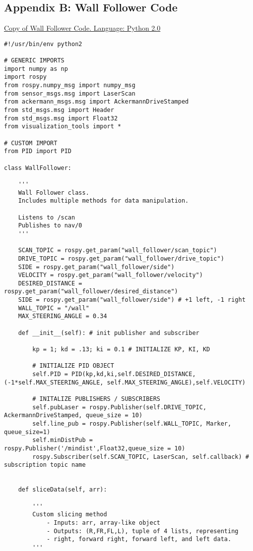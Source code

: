 \documentclass{article}
\begin{document}
\subsection{Appendix B: Wall Follower Code}
\underline{Copy of Wall Follower Code. Language: Python 2.0}

{\footnotesize
\begin{verbatim}
#!/usr/bin/env python2

# GENERIC IMPORTS
import numpy as np
import rospy
from rospy.numpy_msg import numpy_msg
from sensor_msgs.msg import LaserScan
from ackermann_msgs.msg import AckermannDriveStamped
from std_msgs.msg import Header
from std_msgs.msg import Float32
from visualization_tools import *

# CUSTOM IMPORT
from PID import PID

class WallFollower:

    '''
    Wall Follower class. 
    Includes multiple methods for data manipulation. 

    Listens to /scan
    Publishes to nav/0 
    '''

    SCAN_TOPIC = rospy.get_param("wall_follower/scan_topic")
    DRIVE_TOPIC = rospy.get_param("wall_follower/drive_topic")
    SIDE = rospy.get_param("wall_follower/side")
    VELOCITY = rospy.get_param("wall_follower/velocity")
    DESIRED_DISTANCE = rospy.get_param("wall_follower/desired_distance")
    SIDE = rospy.get_param("wall_follower/side") # +1 left, -1 right
    WALL_TOPIC = "/wall"
    MAX_STEERING_ANGLE = 0.34

    def __init__(self): # init publisher and subscriber

        kp = 1; kd = .13; ki = 0.1 # INITIALIZE KP, KI, KD

        # INITIALIZE PID OBJECT
        self.PID = PID(kp,kd,ki,self.DESIRED_DISTANCE,(-1*self.MAX_STEERING_ANGLE, self.MAX_STEERING_ANGLE),self.VELOCITY)
        
        # INITALIZE PUBLISHERS / SUBSCRIBERS
        self.pubLaser = rospy.Publisher(self.DRIVE_TOPIC, AckermannDriveStamped, queue_size = 10)
        self.line_pub = rospy.Publisher(self.WALL_TOPIC, Marker, queue_size=1)
        self.minDistPub = rospy.Publisher('/mindist',Float32,queue_size = 10)
        rospy.Subscriber(self.SCAN_TOPIC, LaserScan, self.callback) # subscription topic name


    def sliceData(self, arr):

        '''
        Custom slicing method
            - Inputs: arr, array-like object
            - Outputs: (R,FR,FL,L), tuple of 4 lists, representing
            - right, forward right, forward left, and left data. 
        '''


\end{verbatim}}
\end{document}
